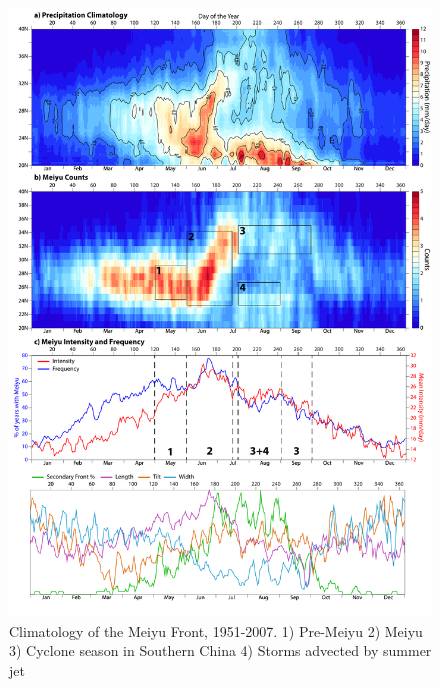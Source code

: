 \documentclass[draft,grl]{AGUTeX}
\begin{document}
%
%
%
%
%
%

\begin{figure}
\noindent\includegraphics[width=36pc]{fig1_dingchan.pdf}
\caption{Climatology of the Meiyu Front, 1951-2007. 1) Pre-Meiyu 2) Meiyu 3) Cyclone season in Southern China 4) Storms advected by summer jet}
\label{figure_label}
\end{figure}
\end{document}

